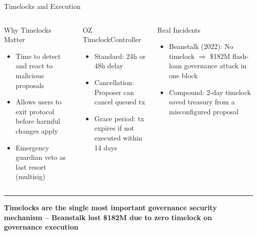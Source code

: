 \documentclass[8pt,aspectratio=169]{beamer}
\newcommand{\bottomnote}[1]{\vfill\vspace{-2mm}\textcolor{mllavender2}{\rule{\textwidth}{0.4pt}}\vspace{1mm}\footnotesize\textbf{#1}}
\begin{document}
\begin{frame}{Timelocks and Execution}
\vspace{3mm}
\begin{columns}[T]
\begin{block}{\footnotesize Why Timelocks Matter}
\scriptsize
\begin{itemize}
  \item Time to detect and react to malicious proposals
  \item Allows users to exit protocol before harmful changes apply
  \item Emergency guardian veto as last resort (multisig)
\end{itemize}
\end{block}
\begin{block}{\footnotesize OZ TimelockController}
\scriptsize
\begin{itemize}
  \item Standard: 24h or 48h delay
  \item Cancellation: Proposer can cancel queued tx
  \item Grace period: tx expires if not executed within 14 days
\end{itemize}
\end{block}
\begin{alertblock}{\footnotesize Real Incidents}
\scriptsize
\begin{itemize}
  \item Beanstalk (2022): No timelock $\Rightarrow$ \$182M flash-loan governance attack in one block
  \item Compound: 2-day timelock saved treasury from a misconfigured proposal
\end{itemize}
\end{alertblock}
\end{columns}
\bottomnote{Timelocks are the single most important governance security mechanism -- Beanstalk lost \$182M due to zero timelock on governance execution}
\end{frame}
\end{document}
